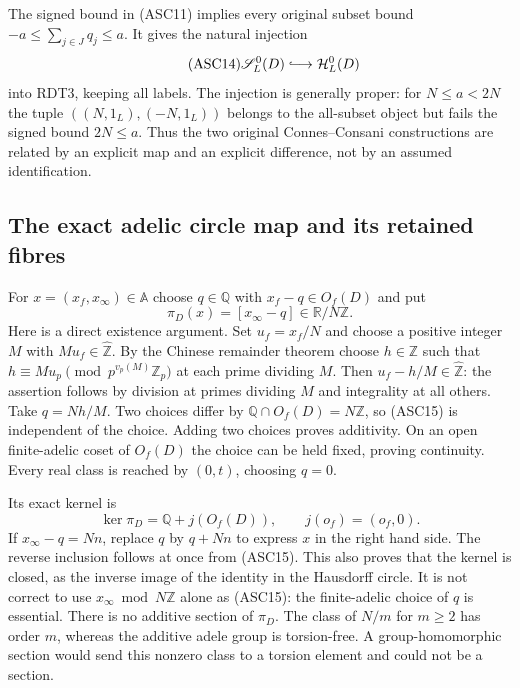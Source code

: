 The signed bound in (ASC11) implies every original subset bound
$-a\le\sum_{j\in J}q_j\le a$. It gives the natural injection
\begin{equation}\tag{ASC14}
\mathscr S_L^0(D)\lhook\joinrel\longrightarrow
\mathcal H_L^0(D)
\end{equation}
into RDT3, keeping all labels. The injection is generally proper:
for $N\le a<2N$ the tuple $((N,1_L),(-N,1_L))$ belongs to the
all-subset object but fails the signed bound $2N\le a$.
Thus the two original Connes--Consani constructions are related
by an explicit map and an explicit difference, not by an assumed
identification.

\subsection{The exact adelic circle map and its retained fibres}

For $x=(x_f,x_\infty)\in\mathbb A$ choose $q\in\mathbb Q$
with $x_f-q\in O_f(D)$ and put
\begin{equation}\tag{ASC15}
\pi_D(x)=[x_\infty-q]\in\mathbb R/N\mathbb Z.
\end{equation}
Here is a direct existence argument. Set $u_f=x_f/N$ and choose
a positive integer $M$ with $Mu_f\in\widehat{\mathbb Z}$.
By the Chinese remainder theorem choose $h\in\mathbb Z$ such
that $h\equiv Mu_p\pmod {p^{v_p(M)}\mathbb Z_p}$ at each
prime dividing $M$. Then $u_f-h/M\in\widehat{\mathbb Z}$:
the assertion follows by division at primes dividing $M$ and
integrality at all others. Take $q=Nh/M$.
Two choices differ by $\mathbb Q\cap O_f(D)=N\mathbb Z$,
so (ASC15) is independent of the choice. Adding two choices
proves additivity. On an open finite-adelic coset of $O_f(D)$
the choice can be held fixed, proving continuity. Every real
class is reached by $(0,t)$, choosing $q=0$.

Its exact kernel is
\begin{equation}\tag{ASC16}
\ker\pi_D=\mathbb Q+j(O_f(D)),\qquad j(o_f)=(o_f,0).
\end{equation}
If $x_\infty-q=Nn$, replace $q$ by $q+Nn$ to express $x$
in the right hand side. The reverse inclusion follows at once
from (ASC15). This also proves that the kernel is closed,
as the inverse image of the identity in the Hausdorff circle.
It is not correct to use $x_\infty\bmod N\mathbb Z$ alone
as (ASC15): the finite-adelic choice of $q$ is essential.
There is no additive section of $\pi_D$. The class of $N/m$
for $m\ge2$ has order $m$, whereas the additive adele group
is torsion-free. A group-homomorphic section would send this
nonzero class to a torsion element and could not be a section.


